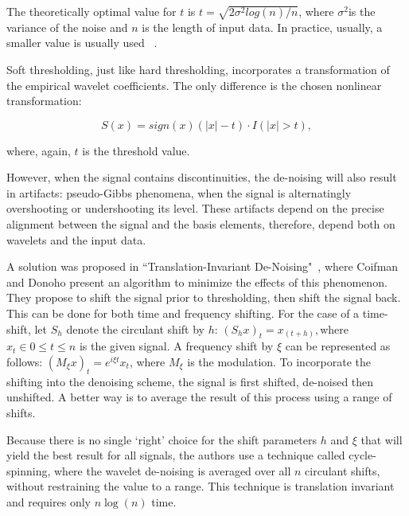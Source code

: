 The theoretically optimal value for $t$ is $t=\sqrt{2\sigma^{2}log(n)/n}$, where $\sigma^{2}$is the variance of the noise and $n$ is the length of input data. In practice, usually, a smaller value is usually used ~\cite{thresholding}.

Soft thresholding, just like hard thresholding, incorporates a transformation of the empirical wavelet coefficients. The only difference is the chosen nonlinear transformation:

\begin{equation}
    S(x)=sign(x)(|x|-t)\cdot I(|x|>t),
    \label{eq:wavelet_2}
\end{equation}

where, again, $t$ is the threshold value.

However, when the signal contains discontinuities, the de-noising will also result in artifacts: pseudo-Gibbs phenomena, when the signal is alternatingly overshooting or undershooting its level. These artifacts depend on the precise alignment between the signal and the basis elements, therefore, depend both on wavelets and the input data. 

A solution was proposed in ``Translation-Invariant De-Noising"~\cite{wavelet}, where Coifman and Donoho present an algorithm to minimize the effects of this phenomenon. They propose to shift the signal prior to thresholding, then shift the signal back. This can be done for both time and frequency shifting. For the case of a time-shift, let $S_{h}$ denote the circulant shift by $h$: $(S_{h}x)_{t}=x_{(t+h)}, $where $x_{t}\in0\leq t\leq n$ is the given signal. A frequency shift by $\xi$ can be represented as follows: $(M_{\xi}x)_{t}=e^{i\xi t}x_{t}$, where $M_{\xi}$ is the modulation. To incorporate the shifting into the denoising scheme, the signal is first shifted, de-noised then unshifted. A better way is to average the result of this process using a range of shifts.
 
Because there is no single `right' choice for the shift parameters $h$ and $\xi$ that will yield the best result for all signals, the authors use a technique called cycle-spinning, where the wavelet de-noising is averaged over all $n$ circulant shifts, without restraining the value to a range. This technique is translation invariant and requires only $n\log(n)$ time.

